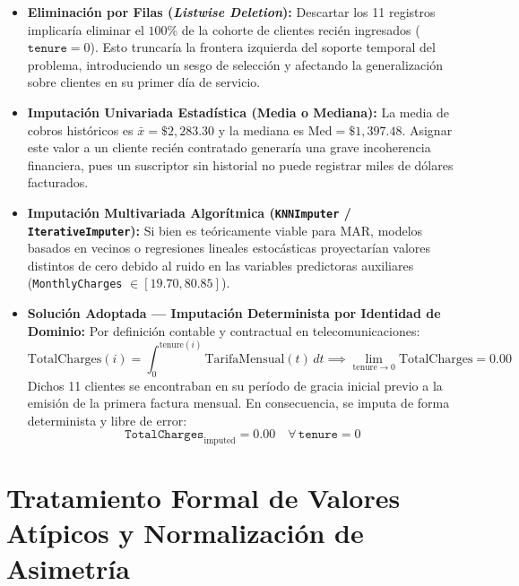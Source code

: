\documentclass[11pt,letterpaper]{article}
\begin{document}
\begin{itemize}
    \item \textbf{Eliminación por Filas (\textit{Listwise Deletion}):} Descartar los 11 registros implicaría eliminar el $100\%$ de la cohorte de clientes recién ingresados ($\texttt{tenure} = 0$). Esto truncaría la frontera izquierda del soporte temporal del problema, introduciendo un sesgo de selección y afectando la generalización sobre clientes en su primer día de servicio.
    \item \textbf{Imputación Univariada Estadística (Media o Mediana):} La media de cobros históricos es $\bar{x} = \$2,283.30$ y la mediana es $\text{Med} = \$1,397.48$. Asignar este valor a un cliente recién contratado generaría una grave incoherencia financiera, pues un suscriptor sin historial no puede registrar miles de dólares facturados.
    \item \textbf{Imputación Multivariada Algorítmica (\texttt{KNNImputer} / \texttt{IterativeImputer}):} Si bien es teóricamente viable para MAR, modelos basados en vecinos o regresiones lineales estocásticas proyectarían valores distintos de cero debido al ruido en las variables predictoras auxiliares (\texttt{MonthlyCharges} $\in [19.70, 80.85]$).
    \item \textbf{Solución Adoptada — Imputación Determinista por Identidad de Dominio:} Por definición contable y contractual en telecomunicaciones:
    \begin{equation}
        \text{TotalCharges}(i) = \int_0^{\text{tenure}(i)} \text{TarifaMensual}(t) \, dt \implies \lim_{\text{tenure} \to 0} \text{TotalCharges} = 0.00
    \end{equation}
    Dichos 11 clientes se encontraban en su período de gracia inicial previo a la emisión de la primera factura mensual. En consecuencia, se imputa de forma determinista y libre de error:
    \begin{equation}
        \texttt{TotalCharges}_{\text{imputed}} = 0.00 \quad \forall \, \texttt{tenure} = 0
    \end{equation}
\end{itemize}

\section{Tratamiento Formal de Valores Atípicos y Normalización de Asimetría}
\end{document}
